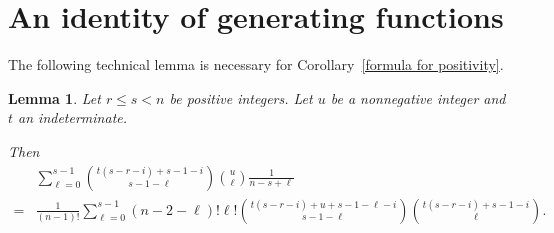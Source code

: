 \documentclass[11pt]{amsart}
\newtheorem{lemma}[theorem]{Lemma}
\theoremstyle{definition}
\newcommand{\0}{\emptyset}
\begin{document}
\appendix

\section{An identity of generating functions}

The following technical lemma is necessary for Corollary~\ref{formula for positivity}.

\begin{lemma}\label{lem:genfunc}
Let $r\leq s < n$ be positive integers. Let $u$ be a nonnegative integer and $t$ an indeterminate.

Then
\begin{align*}
&\sum_{\ell=0}^{s-1}\binom{t(s-r-i)+s-1-i}{s-1-\ell}\binom{u}{\ell}\frac{1}{n-s+\ell}\\
=&\frac{1}{(n-1)!}\sum_{\ell=0}^{s-1}(n-2-\ell)!\ell!\binom{t(s-r-i)+u+s-1-\ell-i}{s-1-\ell}\binom{t(s-r-i)+s-1-i}{\ell}.
\end{align*}
\end{lemma}
\end{document}
